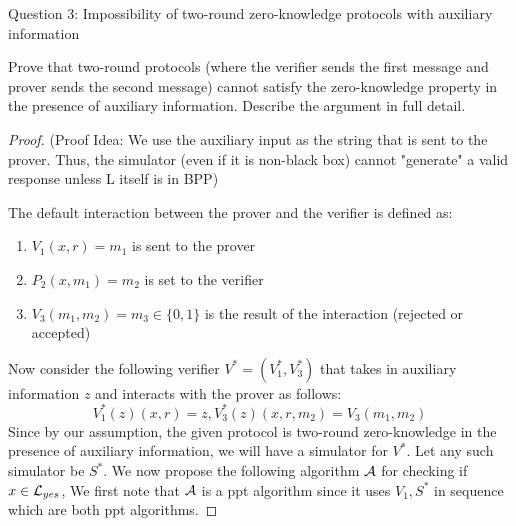 \begin{solution}{Question 3: Impossibility of two-round zero-knowledge protocols with auxiliary information}\label{ques:3}
    \begin{question}
        Prove that two-round protocols (where the verifier sends the first message and prover sends the second message) cannot satisfy the zero-knowledge property in the presence of auxiliary information. Describe the argument in full detail.
    \end{question}
    \tcblower{}
    \begin{proof}
        (Proof Idea: We use the auxiliary input as the string that is sent to the prover. Thus, the simulator (even if it is non-black box) cannot "generate" a valid response unless L itself is in BPP)\par
        The default interaction between the prover and the verifier is defined as:
        \begin{enumerate}
            \item $V_1(x, r) = m_1$ is sent to the prover
            \item $P_2(x, m_1) = m_2$ is set to the verifier
            \item $V_3(m_1, m_2) = m_3 \in \{0, 1\}$ is the result of the interaction (rejected or accepted)
        \end{enumerate}
        Now consider the following verifier $V^* = (V_1^*, V_3^*)$ that takes in auxiliary information $z$ and interacts with the prover as follows:
        \begin{equation}
            V_1^*(z)(x, r) = z, V_3^*(z)(x, r, m_2) = V_3(m_1, m_2)
        \end{equation}
        Since by our assumption, the given protocol is two-round zero-knowledge in the presence of auxiliary information, we will have a simulator for $V^*$. Let any such simulator be $S^*$. We now propose the following algorithm $\mathcal{A}$ for checking if $x \in \mathcal{L}_{yes}$,
        We first note that $\mathcal{A}$ is a ppt algorithm since it uses $V_1, S^*$ in sequence which are both ppt algorithms.\par


\end{proof}
\end{solution}

